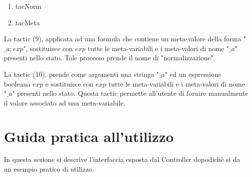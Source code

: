 \documentclass[]{article}
\begin{document}
\begin{enumerate}
	\setcounter{enumi}{\theenumTemp}
	\item tacNorm
	\item tacMeta
\end{enumerate}
La tactic (9), applicata ad una formula che contiene  un meta-valore della forma "$\_a: exp$", sostituisce con $exp$ tutte le meta-variabili e i meta-valori di nome "$\_a$" presenti nello stato. Tale processo prende il nome di "normalizzazione".

La tactic (10), prende come argomenti una stringa "$\_a$" ed un espressione booleana $exp$ e sostituisce con $exp$ tutte le meta-variabili e i meta-valori di nome "$\_a$" presenti nello stato. Questa tactic permette all'utente di fornire manualmente il valore associato ad una meta-variabile.

\section{Guida pratica all'utilizzo}
In questa sezione si descrive l'interfaccia esposta dal Controller dopodich\`e si da un esempio pratico di utilizzo.
\end{document}
